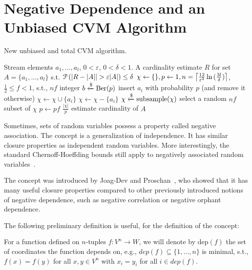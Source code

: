 \section{Negative Dependence and an Unbiased CVM Algorithm\label{sec:negdep}}
\begin{algorithm}[t!]
	\caption{New unbiased and total CVM algorithm.}\label{alg:cvm_new}
	\begin{algorithmic}[1]
  \Require Stream elements $a_1,\dots,a_l$, $0 < \varepsilon$, $0 < \delta < 1$.
  \Ensure A cardinality estimate $R$ for set $A = \{ a_1,\dots,a_l \}$ s.t. $\prob \left( |R - |A| | > \varepsilon |A| \right) \leq \delta$
  \State $\chi \gets \{\}, p \gets 1, n = \ceil*{\frac{12}{\varepsilon^2} \ln{(\frac{3l}{\delta})} }$, $\frac{1}{2} \leq f < 1$, s.t., $nf$ integer
    \State $b \getsr \Ber(p)$ \Comment insert $a_i$ with probability $p$ (and remove it otherwise)
      \State $\chi \gets \chi \cup \{a_i\}$
    \Else
      \State $\chi \gets \chi - \{a_i\}$
    \EndIf
      \State $\chi \getsr \mathrm{subsample}(\chi)$ \Comment select a random $nf$ subset of $\chi$
      \State $p \gets pf$
    \EndIf
  \EndFor
  \State \Return $\frac{|\chi|}{p}$ \Comment estimate cardinality of $A$
  \end{algorithmic}
\end{algorithm}%
Sometimes, sets of random variables possess a property called negative association.
The concept is a generalization of independence.
It has similar closure properties as independent random variables.
More interestingly, the standard Chernoff-Hoeffding bounds still apply to negatively associated random variables~\cite[Prop. 7]{dubhashi1998}.

The concept was introduced by Joag-Dev and Proschan~\cite{joagdev1983}, who showed that it has many useful closure properties compared to other previously introduced notions of negative dependence, such as negative correlation or negative orphant dependence. 

The following preliminary definition is useful, for the definition of the concept:
\begin{definition}
For a function defined on $n$-tuples $f: V^n \rightarrow W$, we will denote by $\mathrm{dep}(f)$ the set of coordinates the function depends on, e.g., $dep(f) \subseteq \{1,\ldots,n\}$ is minimal, s.t., $f(x) = f(y)$ for all $x, y \in V^n$ with $x_i = y_i$ for all $i \in dep(f)$.
\end{definition}

